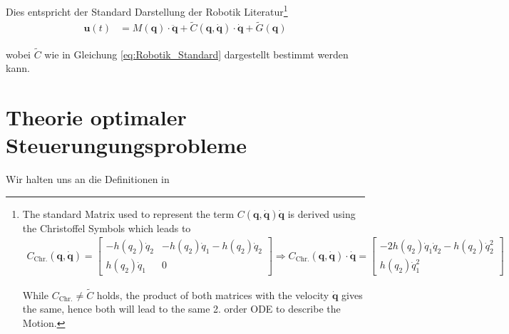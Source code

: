 \documentclass[a4paper, 12pt]{scrartcl}
\begin{document}
Dies entspricht der Standard Darstellung der Robotik Literatur\footnote{
    The standard Matrix used to represent the term 
    $C(\bm{q},\bm{\dot{q}})\bm{\dot{q}}$ is derived using the 
    Christoffel Symbols which leads to
    \begin{align*}
        C_{\text{Chr.}}(\bm{q},\bm{\dot{q}})
        =
        \begin{bmatrix}
            - h(q_2) \dot{q}_2
            &
            - h(q_2) \dot{q}_1 
            - h(q_2) \dot{q}_2
            \\
            h(q_2) \dot{q}_1 
            &
            0
        \end{bmatrix}
        \Rightarrow
        C_{\text{Chr.}}(\bm{q},\bm{\dot{q}}) \cdot \bm{\dot{q}}
        =
        \begin{bmatrix}
            - 2h(q_2) \dot{q}_1 \dot{q}_2 - h(q_2) \dot{q}_2^2 
            \\
            h(q_2) \dot{q}_1^2
        \end{bmatrix}
    \end{align*}

    While $C_{\text{Chr.}} \neq \tilde{C}$ holds, the product of both matrices 
    with the velocity $\bm{\dot{q}}$ gives the same, hence both will lead to the same 
    2. order ODE to describe the Motion. 
}
%
\begin{align*}
    \bm{u}(t)
    &=
    M(\bm{q})
    \cdot
    \bm{\ddot{q}}
    +
    \tilde{C}(\bm{q},\bm{\dot{q}}) \cdot \bm{\dot{q}}
    + 
    \tilde{G}(\bm{q})
\end{align*}

wobei $\tilde{C}$ wie in Gleichung \ref{eq:Robotik_Standard} dargestellt 
bestimmt werden kann. 


\newpage

\section{Theorie optimaler Steuerungungsprobleme}\label{Chapter:OCP}

Wir halten uns an die Definitionen in \cite{gerdts2012}
\end{document}
